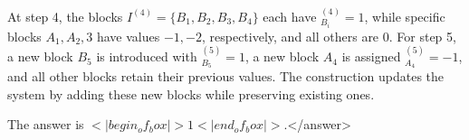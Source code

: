 At step 4, the blocks \( I^{(4)} = \{B_1, B_2, B_3, B_4\} \) each have \( ^{(4)}_{B_i} = 1 \), while specific blocks \( A_1, A_2,3 \) have values \( -1, -2 \), respectively, and all others are 0. For step 5, a new block \( B_5 \) is introduced with \( ^{(5)}_{B_5} = 1 \), a new block \( A_4 \) is assigned \( ^{(5)}_{A_4} = -1 \), and all other blocks retain their previous values. The construction updates the system by adding these new blocks while preserving existing ones.  

The answer is \(<|begin_of_box|>1<|end_of_box|>\).</answer>